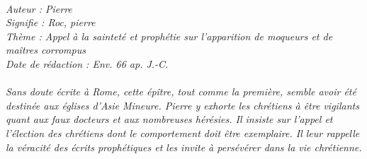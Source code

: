 \BFont
\noindent\hrulefill
{\footnotesize
\textit{
\bigskip
{\centering{}
\\Auteur : Pierre
\\Signifie : Roc, pierre
\\Thème : Appel à la sainteté et prophétie sur l'apparition de moqueurs et de maîtres corrompus
\\Date de rédaction : Env. 66 ap. J.-C.\\}
}
\textit{
\\Sans doute écrite à Rome, cette épître, tout comme la première, semble avoir été destinée aux églises d’Asie Mineure. Pierre y exhorte les chrétiens à être vigilants quant aux faux docteurs et aux nombreuses hérésies. Il insiste sur l’appel et l’élection des chrétiens dont le comportement doit être exemplaire. Il leur rappelle la véracité des écrits prophétiques et les invite à persévérer dans la vie chrétienne.\bigskip
}
}
\par\nobreak\noindent\hrulefill
